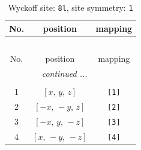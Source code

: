 \documentclass[fleqn,8pt]{jsarticle}
\begin{document}
\renewcommand{\arraystretch}{1.2}
\begin{longtable}{ccc}
\caption{Wyckoff site: {\tt 8l}, site symmetry: {\tt 1}}
 \\
 \hline \hline
No. & position & mapping \\ \hline \endfirsthead

\multicolumn{2}{l}{\tablename\ \thetable{}} \\
 \hline \hline
No. & position & mapping \\ \hline \endhead

 \hline \hline
\multicolumn{2}{r}{\footnotesize\it continued ...} \\ \endfoot

 \hline \hline
\multicolumn{2}{r}{} \\ \endlastfoot

1 & $\left[ x,\, y,\, z \right]$ & {\tt [1]} \\ \hline
2 & $\left[ - x,\, - y,\, z \right]$ & {\tt [2]} \\ \hline
3 & $\left[ - x,\, y,\, - z \right]$ & {\tt [3]} \\ \hline
4 & $\left[ x,\, - y,\, - z \right]$ & {\tt [4]} \\
\end{longtable}
\end{document}
